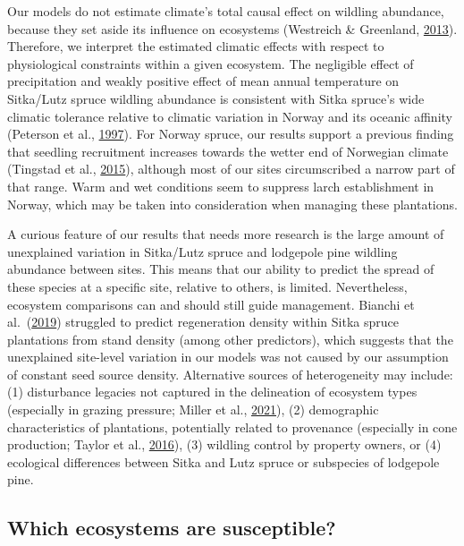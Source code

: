 \documentclass[
]{article}
\begin{document}
Our models do not estimate climate's total causal effect on wildling abundance, because they set aside its influence on ecosystems (Westreich \& Greenland, \protect\hyperlink{ref-westreichTableFallacyPresenting2013}{2013}).
Therefore, we interpret the estimated climatic effects with respect to physiological constraints within a given ecosystem.
The negligible effect of precipitation and weakly positive effect of mean annual temperature on Sitka/Lutz spruce wildling abundance is consistent with Sitka spruce's wide climatic tolerance relative to climatic variation in Norway and its oceanic affinity (Peterson et al., \protect\hyperlink{ref-petersonEcologyManagementSitka1997}{1997}).
For Norway spruce, our results support a previous finding that seedling recruitment increases towards the wetter end of Norwegian climate (Tingstad et al., \protect\hyperlink{ref-tingstadTemperaturePrecipitationBiotic2015}{2015}), although most of our sites circumscribed a narrow part of that range.
Warm and wet conditions seem to suppress larch establishment in Norway, which may be taken into consideration when managing these plantations.

A curious feature of our results that needs more research is the large amount of unexplained variation in Sitka/Lutz spruce and lodgepole pine wildling abundance between sites.
This means that our ability to predict the spread of these species at a specific site, relative to others, is limited.
Nevertheless, ecosystem comparisons can and should still guide management.
Bianchi et al.~(\protect\hyperlink{ref-bianchiMethodsPredictingSitka2019}{2019}) struggled to predict regeneration density within Sitka spruce plantations from stand density (among other predictors), which suggests that the unexplained site-level variation in our models was not caused by our assumption of constant seed source density.
Alternative sources of heterogeneity may include: (1) disturbance legacies not captured in the delineation of ecosystem types (especially in grazing pressure; Miller et al., \protect\hyperlink{ref-millerHowDisturbanceHistory2021}{2021}), (2) demographic characteristics of plantations, potentially related to provenance (especially in cone production; Taylor et al., \protect\hyperlink{ref-taylorDriversPlantInvasion2016}{2016}), (3) wildling control by property owners, or (4) ecological differences between Sitka and Lutz spruce or subspecies of lodgepole pine.

\hypertarget{which-ecosystems-are-susceptible}{%
\subsection{Which ecosystems are susceptible?}\label{which-ecosystems-are-susceptible}}
\end{document}
